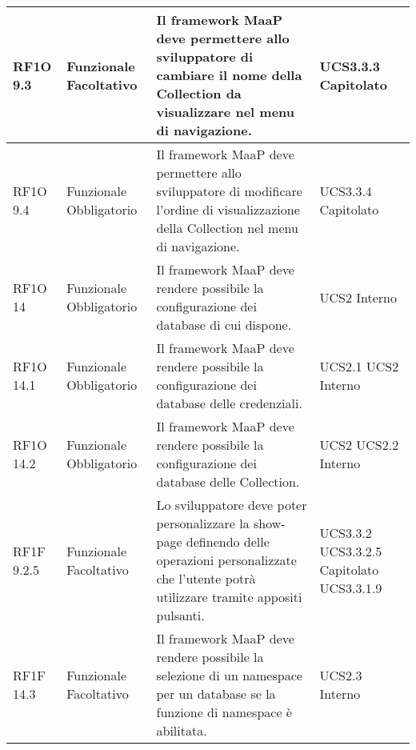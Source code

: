 \begin{center}
\begin{longtable}{ | l | p{2cm} | p{5cm} | p{1.7cm} |}
        RF1O 9.3 & Funzionale \newline  Facoltativo  & Il framework MaaP deve permettere allo sviluppatore di cambiare il nome della Collection da visualizzare nel menu di navigazione. &  UCS3.3.3 \newline  Capitolato \newline  \\ \hline      
        RF1O 9.4 & Funzionale \newline  Obbligatorio  & Il framework MaaP deve permettere allo sviluppatore di modificare l'ordine di visualizzazione della Collection nel menu di navigazione. &  UCS3.3.4 \newline  Capitolato \newline  \\ \hline      
        RF1O 14 & Funzionale \newline  Obbligatorio  & Il framework MaaP deve rendere possibile la configurazione dei database di cui dispone. &  UCS2 \newline  Interno \newline  \\ \hline      
        RF1O 14.1 & Funzionale \newline  Obbligatorio  & Il framework MaaP deve rendere possibile la configurazione dei database delle credenziali. &  UCS2.1 \newline  UCS2 \newline  Interno \newline  \\ \hline      
        RF1O 14.2 & Funzionale \newline  Obbligatorio  & Il framework MaaP deve rendere possibile la configurazione dei database delle Collection. &  UCS2 \newline  UCS2.2 \newline  Interno \newline  \\ \hline      
        RF1F 9.2.5 & Funzionale \newline  Facoltativo  & Lo sviluppatore deve poter personalizzare la show-page definendo delle operazioni personalizzate che l'utente potrà utilizzare tramite appositi pulsanti. &  UCS3.3.2 \newline  UCS3.3.2.5 \newline  Capitolato \newline  UCS3.3.1.9 \newline  \\ \hline      
        RF1F 14.3 & Funzionale \newline  Facoltativo  & Il framework MaaP deve rendere possibile la selezione di un namespace per un database se la funzione di namespace è abilitata. &  UCS2.3 \newline  Interno \newline  \\ \hline      

\end{longtable}
\end{center}
